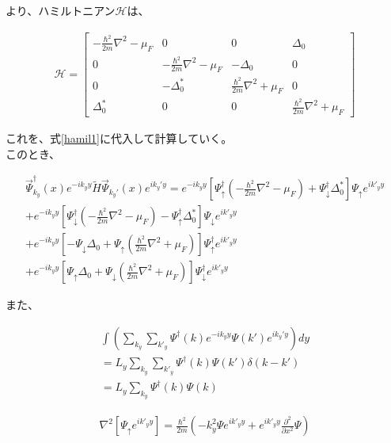 \documentclass{jsarticle}
\begin{document}
		より、ハミルトニアン$\mathcal{H}$は、

		\begin{align}
			\mathcal{H}=
			\begin{bmatrix}
				-\frac{\hbar^2}{2m}\nabla^2-\mu_F & 0 & 0 & \Delta_0 \\
				0 & -\frac{\hbar^2}{2m}\nabla^2-\mu_F & -\Delta_0 & 0 \\
				0 & -\Delta_0^\ast & \frac{\hbar^2}{2m}\nabla^2+\mu_F & 0 \\
				\Delta_0^\ast & 0 & 0 & \frac{\hbar^2}{2m}\nabla^2+\mu_F
			\end{bmatrix}
		\end{align}

		これを、式\eqref{hamil1}に代入して計算していく。　\\
		このとき、

		\begin{align}
			\vec{\Psi}_{k_y}^\dagger(x) e^{-ik_yy} \tilde{H}  \vec{\Psi}_{k_y'}(x) e^{ik_y'y} =
			e^{-ik_yy} \left[ \Psi_\uparrow^\dagger \left( -\frac{\hbar^2}{2m}\nabla^2-\mu_F \right) +\Psi_\downarrow^\dagger \Delta_0^\ast \right] \Psi_\uparrow e^{ik'_yy} \nonumber\\
			+e^{-ik_yy} \left[ \Psi_\downarrow^\dagger \left( -\frac{\hbar^2}{2m}\nabla^2-\mu_F \right) -\Psi_\uparrow^\dagger \Delta_0^\ast \right] \Psi_\downarrow e^{ik'_yy} \nonumber\\
			+ e^{-ik_yy} \left[ -\Psi_\downarrow\Delta_0 +\Psi_\uparrow \left( \frac{\hbar^2}{2m}\nabla^2+\mu_F \right) \right] \Psi_\uparrow^\dagger e^{ik'_yy} \nonumber\\
			+e^{-ik_yy} \left[ \Psi_\uparrow\Delta_0 +\Psi_\downarrow \left( \frac{\hbar^2}{2m}\nabla^2+\mu_F \right) \right] \Psi_\downarrow^\dagger e^{ik'_yy}
		\end{align}

		また、

		\begin{align}
		\int \left( \sum_{k_y}\sum_{k'_y}\Psi^\dagger(k) e^{-ik_yy}\Psi(k')e^{ik_y'y} \right) dy \nonumber \\
		=L_y\sum_{k_y}\sum_{k'_y}\Psi^\dagger(k) \Psi(k')\delta \left( k-k' \right) \nonumber \\
		=L_y\sum_{k_y}\Psi^\dagger(k)\Psi(k)
		\end{align}

		\begin{align}
			\nabla^2 \left[ \Psi_\uparrow e^{ik'_yy} \right]=
			\frac{\hbar^2}{2m}
			\left( -k_y^2\Psi e^{ik'_yy} + e^{ik'_yy}\frac{\partial^2}{\partial x^2}\Psi \right)
		\end{align}
\end{document}
